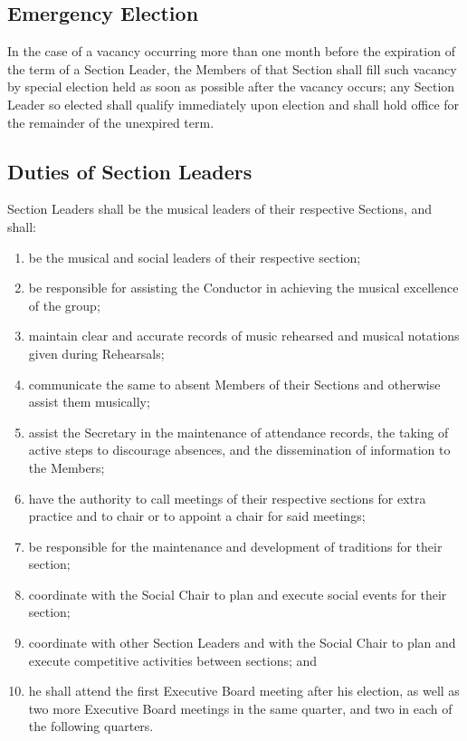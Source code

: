 \documentclass{article}
\begin{document}
\subsection{Emergency Election}

In the case of a vacancy occurring more than one month before the
expiration of the term of a Section Leader, the Members of that Section
shall fill such vacancy by special election held as soon as possible
after the vacancy occurs; any Section Leader so elected shall qualify
immediately upon election and shall hold office for the remainder
of the unexpired term.

\subsection{Duties of Section Leaders}

Section Leaders shall be the musical leaders of their respective Sections,
and shall:
\begin{enumerate}
\item be the musical and social leaders of their respective section;
\item be responsible for assisting the Conductor in achieving the musical
excellence of the group;
\item maintain clear and accurate records of music rehearsed and musical
notations given during Rehearsals;
\item communicate the same to absent Members of their Sections and otherwise
assist them musically;
\item assist the Secretary in the maintenance of attendance records, the
taking of active steps to discourage absences, and the dissemination
of information to the Members;
\item have the authority to call meetings of their respective sections for
extra practice and to chair or to appoint a chair for said meetings;
\item be responsible for the maintenance and development of traditions for
their section;
\item coordinate with the Social Chair to plan and execute social events
for their section;
\item coordinate with other Section Leaders and with the Social Chair to
plan and execute competitive activities between sections; and
\item he shall attend the first Executive Board meeting after his election,
as well as two more Executive Board meetings in the same quarter,
and two in each of the following quarters.
\end{enumerate}
\end{document}
